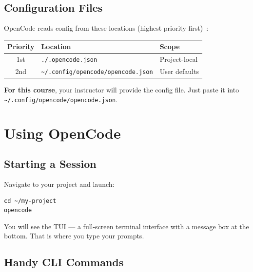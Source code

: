 \documentclass[12pt]{article}
\begin{document}
\subsection{Configuration Files}

OpenCode reads config from these locations (highest priority first)~\cite{opencode_readme2025}:

\begin{center}
\begin{tabular}{cll}
\toprule
\textbf{Priority} & \textbf{Location} & \textbf{Scope} \\
\midrule
1st & \texttt{./.opencode.json} & Project-local \\
2nd & \texttt{\textasciitilde/.config/opencode/opencode.json} & User defaults \\
\bottomrule
\end{tabular}
\end{center}

\begin{ex-box}
\textbf{For this course}, your instructor will provide the config file.  Just paste it into \texttt{\textasciitilde/.config/opencode/opencode.json}.
\end{ex-box}

\section{Using OpenCode}

\subsection{Starting a Session}

Navigate to your project and launch:

\begin{lstlisting}[style=term]
cd ~/my-project
opencode
\end{lstlisting}

You will see the TUI --- a full-screen terminal interface with a message box at the bottom.  That is where you type your prompts.

\subsection{Handy CLI Commands}
\end{document}
